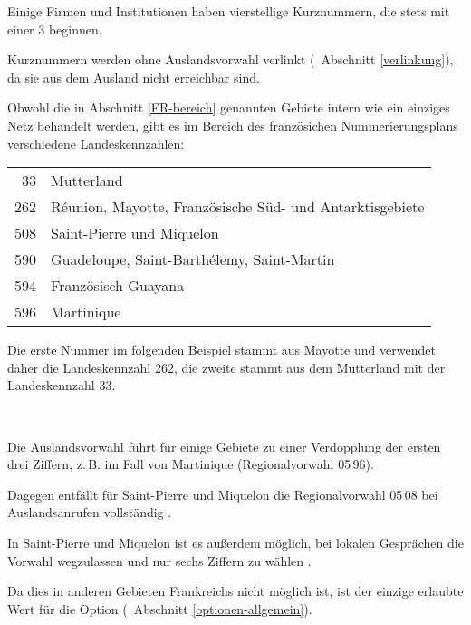 \documentclass[numbers=noenddot]{scrreprt}
\newcommand*{\vglAbschnitt}[1]{(\cf\ Abschnitt \ref{#1})}
\begin{document}
Einige Firmen und Institutionen haben vierstellige Kurznummern, die stets mit einer 3 beginnen.
\begin{sidebyside}
\end{sidebyside}
Kurznummern werden ohne Auslandsvorwahl verlinkt
\vglAbschnitt{verlinkung}, da sie aus dem Ausland nicht erreichbar sind.

Obwohl die in Abschnitt \ref{FR-bereich} genannten Gebiete intern wie ein einziges Netz behandelt werden, gibt es im Bereich des französichen Nummerierungsplans verschiedene Landeskennzahlen:
\begin{center}
\begin{tabular}{rl}
33 & Mutterland \\
262 & R\'eunion, Mayotte, Französische Süd- und Antarktisgebiete \\
508 & Saint-Pierre und Miquelon \\
590 & Guadeloupe, Saint-Barth\'elemy, Saint-Martin \\
594 & Französisch-Guayana \\
596 & Martinique \\
\end{tabular}
\end{center}
Die erste Nummer im folgenden Beispiel stammt aus Mayotte und verwendet daher die Landeskennzahl 262, die zweite stammt aus dem Mutterland mit der Landeskennzahl 33.
\begin{sidebyside}
   \\
\end{sidebyside}

Die Auslandsvorwahl führt für einige Gebiete zu einer Verdopplung der ersten drei Ziffern, z.\,B. im Fall von Martinique (Regionalvorwahl 05\,96).
\begin{sidebyside}
\end{sidebyside}
Dagegen entfällt für Saint-Pierre und Miquelon die Regionalvorwahl 05\,08 bei Auslandsanrufen vollständig \cite[4]{ARCEP}.
\begin{sidebyside}
\end{sidebyside}

In Saint-Pierre und Miquelon ist es außerdem möglich, bei lokalen Gesprächen die Vorwahl wegzulassen und nur sechs Ziffern zu wählen \cite[4]{ARCEP}.
\begin{sidebyside}
\end{sidebyside}
Da dies in anderen Gebieten Frankreichs nicht möglich ist, ist  der einzige erlaubte Wert für die Option  \vglAbschnitt{optionen-allgemein}.
\end{document}

